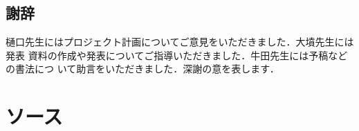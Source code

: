 \documentclass[a4paper,titlepage,disablejfam]{jsbook}
\begin{document}
\section*{謝辞}
樋口先生にはプロジェクト計画についてご意見をいただきました．大墳先生には発表
資料の作成や発表についてご指導いただきました．牛田先生には予稿などの書法につ
いて助言をいただきました．深謝の意を表します．




\appendix
\chapter{ソース}\label{ch:source}


\backmatter
\end{document}
